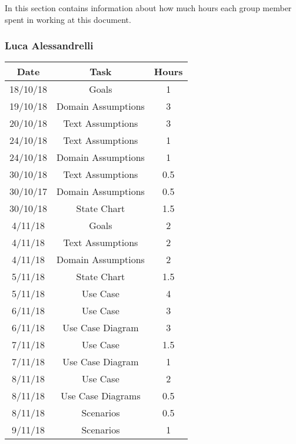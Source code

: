 In this section contains information about how much hours each group member spent in working at this document.
\bigbreak

\subsubsection{Luca Alessandrelli}
\begin{table}[h]
\begin{tabular}{|c|c|c|}
\hline
\rowcolor[HTML]{FE996B} 
Date & Task & Hours 
\\ \hline
\rowcolor[HTML]{FFFC9E} 
18/10/18  & Goals & 1  
\\ \hline
\rowcolor[HTML]{FFFC9E} 
19/10/18 & Domain Assumptions & 3 
\\ \hline
\rowcolor[HTML]{FFFC9E}
20/10/18 & Text Assumptions & 3
\\ \hline
\rowcolor[HTML]{FFFC9E}
24/10/18 & Text Assumptions & 1
\\ \hline
\rowcolor[HTML]{FFFC9E}
24/10/18 & Domain Assumptions & 1
\\ \hline
\rowcolor[HTML]{FFFC9E}
30/10/18 & Text Assumptions & 0.5
\\ \hline
\rowcolor[HTML]{FFFC9E}
30/10/17 & Domain Assumptions & 0.5
\\ \hline
\rowcolor[HTML]{FFFC9E}
30/10/18 & State Chart & 1.5
\\ \hline
\rowcolor[HTML]{FFFC9E}
4/11/18 & Goals & 2
\\ \hline
\rowcolor[HTML]{FFFC9E}
4/11/18 & Text Assumptions & 2
\\ \hline
\rowcolor[HTML]{FFFC9E}
4/11/18 & Domain Assumptions & 2
\\ \hline
\rowcolor[HTML]{FFFC9E}
5/11/18 & State Chart & 1.5
\\ \hline
\rowcolor[HTML]{FFFC9E}
5/11/18 & Use Case & 4
\\ \hline
\rowcolor[HTML]{FFFC9E}
6/11/18 & Use Case & 3
\\ \hline
\rowcolor[HTML]{FFFC9E}
6/11/18 & Use Case Diagram & 3
\\ \hline
\rowcolor[HTML]{FFFC9E}
7/11/18 & Use Case & 1.5
\\ \hline
\rowcolor[HTML]{FFFC9E}
7/11/18 & Use Case Diagram & 1
\\ \hline
\rowcolor[HTML]{FFFC9E}
8/11/18 & Use Case & 2
\\ \hline
\rowcolor[HTML]{FFFC9E}
8/11/18 & Use Case Diagrams & 0.5
\\ \hline
\rowcolor[HTML]{FFFC9E}
8/11/18 & Scenarios & 0.5
\\ \hline
\rowcolor[HTML]{FFFC9E}
9/11/18 & Scenarios & 1
\\ \hline


\end{tabular}
\end{table}
